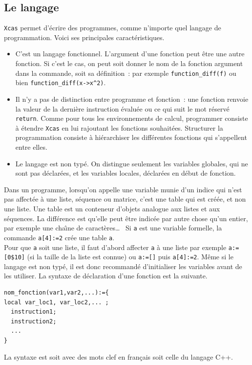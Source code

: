 \documentclass{article}
\begin{document}
\subsection{Le langage}
%
{\tt Xcas} permet d'\'ecrire des  programmes, comme n'importe quel 
langage de programmation. Voici ses
principales caract\'eristiques.
\begin{itemize}
\item
C'est un langage fonctionnel. L'argument d'une fonction peut \^etre
une autre fonction. Si c'est le cas, on peut soit donner le nom de la
fonction argument dans la commande, soit sa d\'efinition~: par exemple
\verb|function_diff(f)| ou bien \verb|function_diff(x->x^2)|.
\item 
Il n'y a pas de distinction entre programme et fonction~: 
une fonction renvoie la valeur de la derni\`ere instruction 
\'evalu\'ee ou ce qui suit le mot r\'eserv\'e \verb|return|.
Comme pour tous les environnements de calcul, programmer
consiste \`a \'etendre {\tt Xcas} en lui rajoutant les fonctions
souhait\'ees. Structurer la programmation consiste \`a hi\'erarchiser
les diff\'erentes fonctions qui s'appellent entre elles.
\item 
Le langage est non typ\'e. On distingue seulement les 
variables globales, qui ne sont pas d\'eclar\'ees, 
et les variables locales, 
d\'eclar\'ees en d\'ebut de fonction.
\end{itemize}
Dans un programme, lorsqu'on appelle une variable munie d'un indice qui n'est 
pas affect\'ee \`a une liste, s\'equence ou matrice, 
c'est une table qui est cr\'e\'ee, et non une liste.
Une table est un conteneur d'objets analogue aux listes et aux
s\'equences. La diff\'erence est qu'elle peut \^etre indic\'ee
par autre chose qu'un entier, par exemple
une cha\^\i ne de caract\`eres\ldots~
Si \verb|a| est une variable formelle, la commande \verb|a[4]:=2|
cr\'ee une table \verb|a|.\\
Pour que \verb|a| soit une liste, il faut d'abord affecter \verb|a|
 \`a une liste par exemple \verb|a:=[0$10]|
(si la taille de la liste est connue) ou \verb|a:=[]| puis 
\verb|a[4]:=2|.
M\^eme si le langage est non typ\'e, il est donc 
recommand\'e d'initialiser
les variables avant de les utiliser.
\noindent
La syntaxe de d\'eclaration d'une fonction est la suivante. 
\begin{verbatim}
nom_fonction(var1,var2,...):={
local var_loc1, var_loc2,... ;
  instruction1;
  instruction2;
  ...
}
\end{verbatim}
La syntaxe  est soit avec des mots clef en 
fran\c{c}ais soit celle du langage C++.
\end{document}
